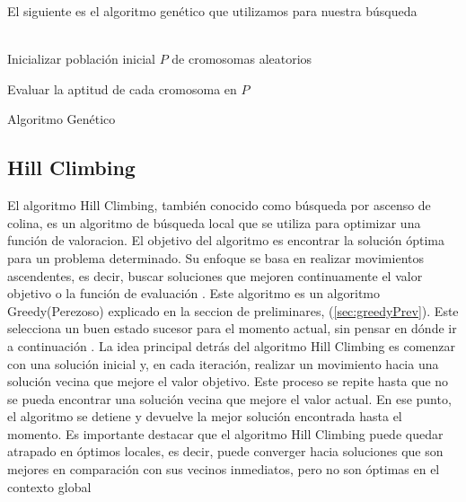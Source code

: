 El siguiente es el algoritmo genético que utilizamos para nuestra búsqueda
\\
\\
\begin{algorithm}[H]

\SetAlgoLined
{}
Inicializar población inicial $P$ de cromosomas aleatorios\;

Evaluar la aptitud de cada cromosoma en $P$\;

\caption{Algoritmo Genético}
\end{algorithm}

\subsection{Hill Climbing}
\label{alg:approachHC}
El algoritmo Hill Climbing, también conocido como búsqueda por ascenso de
colina\cite{Russell:2009}, es un algoritmo de búsqueda local que se utiliza para
optimizar una función de valoracion. El objetivo del algoritmo es encontrar la
solución óptima  para un problema determinado.  Su enfoque se
basa en realizar movimientos ascendentes, es decir, buscar soluciones que
mejoren continuamente el valor objetivo o la función de evaluación .
Este algoritmo es un algoritmo Greedy(Perezoso) explicado en la seccion de
preliminares, (\ref{sec:greedyPrev}). Este selecciona un buen estado sucesor
para el momento actual, sin pensar en dónde ir a continuación . 
La idea principal detrás del algoritmo Hill Climbing es comenzar con una solución inicial y, en cada iteración, realizar un movimiento hacia una solución vecina que mejore el valor objetivo. Este proceso se repite hasta que no se pueda encontrar una solución vecina que mejore el valor actual. En ese punto, el algoritmo se detiene y devuelve la mejor solución encontrada hasta el momento.
Es importante destacar que el algoritmo Hill Climbing puede quedar atrapado en óptimos locales, es decir, puede converger hacia soluciones que son mejores en comparación con sus vecinos inmediatos, pero no son óptimas en el contexto global

